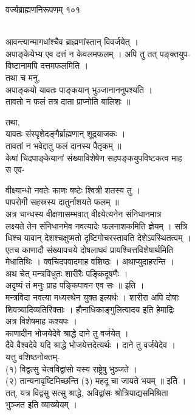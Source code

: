\documentclass[11pt, openany]{book}
\begin{document}
{{{{{{{{{{{{{{ }{ वर्ज्यब्राह्मणनिरूपणम् \textbar{} १०१}{\\
आवन्त्यान्मागधांश्चैव ब्राह्मणांस्तान् विवर्जयेत् ।\\
अपाङ्केयेभ्य एव दत्तं न केवलमफलम् । अपि तु तत् पङ्क्तयुप-\\
विष्टानामपि दत्तमफलमिति ।\\
तथा च मनु,\\
अपाङ्कयो यावतः पाङ्कयान् भुञ्जानाननुपश्यति ।\\
तावतो न फलं तत्र दाता प्राप्नोति बालिशः ॥

{तथा,\\
यावतः संस्पृशेदङ्गैर्ब्राह्मणान् शूद्रयाजकः ।\\
तावतां न भवेद्दातु फलं दानस्य पैतृकम् ॥\\
केषां चिदपाङ्केयानां संख्याविशेषेण सहपङ्कयुपविष्टकत्व माह\\
स एव-

{ वीक्ष्यान्धो नवतेः काणः षष्टेः श्वित्री शतस्य तु ।\\
पापरोगी सहस्रस्य दातुर्नाशयते फलम् ॥\\
अत्र चान्धस्य वीक्षणासम्भवात् वीक्ष्येत्यनेन संनिधानमात्र\\
लक्ष्यते तेन संनिधानमेव नवत्यादेः फलनाशकमिति ज्ञेयम् । सत्रि\\
धिश्च यावान् देशश्चक्षुष्मतो दृष्टिगोचरस्तावति देशेऽवस्थितत्वम् ।\\
एतच काणादौ संख्यापचये दोषलाघवं प्रायश्चित्तविशेषार्थमिति\\
मेधातिथिः । क्वचिदपवादमाह वशिष्ठः । अथाप्युदाहरन्ति ।\\
अथ चेत् मन्त्रविधुतः शारीरैः पङ्किदूषणैः ।\\
अदृष्यं तं मनुः प्राह पङ्किपावन एव सः ॥ इति ।\\
मन्त्रविदा नवत्या मध्यस्थेन युक्त इत्यर्थः । शारीरा अपि दोषाः\\
शिवत्र्यादिव्यतिरिक्ताः । हौनाधिकाङ्गुलित्वादय इति हेमाद्रिः
\textbar{}\\
अत्र विशेषमाह कश्यपः ।\\
काणादीन भोजयेदेवे श्राद्धे दाने तु वर्जयेत् ।\\
दैवे वैश्वदेवे यदि श्राद्धे भोजयेत्तदेत्यर्थः । दाने तु वर्जयेदेव ।\\
यत्तु वशिष्ठनोक्तम्-\\
(१) विद्वत्सु चेत्वविद्वांसो यस्य राष्ट्रेषु भुञ्जते ।\\
(२) तान्यनावृष्टिमिच्छन्ति (३) महदू चा जायते भयम् ॥ इतेि ।\\
तत्, यत्र विद्वसु सत्सु श्राद्धे, अविद्वांसः श्रोत्रियाद्यसमिश्रिता\\
भुञ्जत इति व्याख्येयम् ।

}}}}}}}}}}}}}}}}
\end{document}
